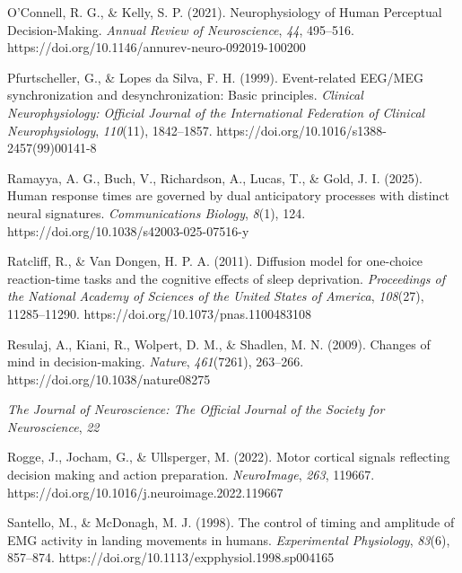 \begin{references}
O'Connell, R. G., \& Kelly, S. P. (2021). Neurophysiology of Human Perceptual Decision-Making. \emph{Annual Review of Neuroscience}, \emph{44}, 495--516. https://doi.org/10.1146/annurev-neuro-092019-100200

Pfurtscheller, G., \& Lopes da Silva, F. H. (1999). Event-related EEG/MEG synchronization and desynchronization: Basic principles. \emph{Clinical Neurophysiology: Official Journal of the International Federation of Clinical Neurophysiology}, \emph{110}(11), 1842--1857. https://doi.org/10.1016/s1388-2457(99)00141-8

Ramayya, A. G., Buch, V., Richardson, A., Lucas, T., \& Gold, J. I. (2025). Human response times are governed by dual anticipatory processes with distinct neural signatures. \emph{Communications Biology}, \emph{8}(1), 124. https://doi.org/10.1038/s42003-025-07516-y


Ratcliff, R., \& Van Dongen, H. P. A. (2011). Diffusion model for one-choice reaction-time tasks and the cognitive effects of sleep deprivation. \emph{Proceedings of the National Academy of Sciences of the United States of America}, \emph{108}(27), 11285--11290. https://doi.org/10.1073/pnas.1100483108

Resulaj, A., Kiani, R., Wolpert, D. M., \& Shadlen, M. N. (2009). Changes of mind in decision-making. \emph{Nature}, \emph{461}(7261), 263--266. https://doi.org/10.1038/nature08275

 \emph{The Journal of Neuroscience: The Official Journal of the Society for Neuroscience}, \emph{22}

Rogge, J., Jocham, G., \& Ullsperger, M. (2022). Motor cortical signals reflecting decision making and action preparation. \emph{NeuroImage}, \emph{263}, 119667. https://doi.org/10.1016/j.neuroimage.2022.119667

Santello, M., \& McDonagh, M. J. (1998). The control of timing and amplitude of EMG activity in landing movements in humans. \emph{Experimental Physiology}, \emph{83}(6), 857--874. https://doi.org/10.1113/expphysiol.1998.sp004165


\end{references}
